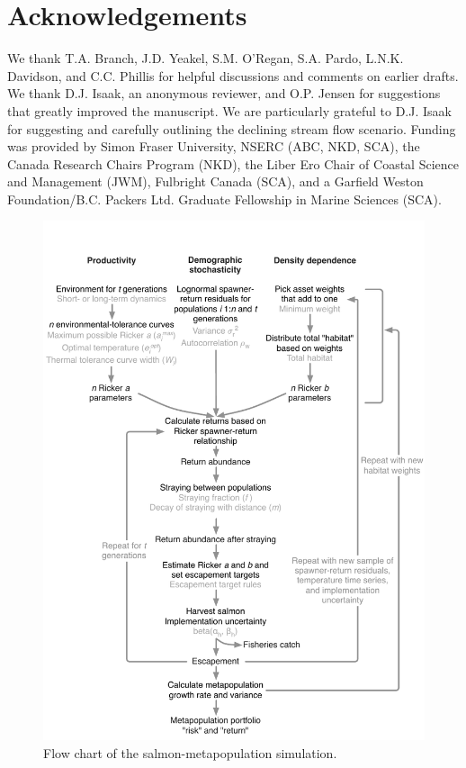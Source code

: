 \section{Acknowledgements}

We thank T.A. Branch, J.D. Yeakel, S.M. O'Regan, S.A. Pardo, L.N.K. Davidson, and C.C. Phillis for helpful discussions and comments on earlier drafts. We thank D.J. Isaak, an anonymous reviewer, and O.P. Jensen for suggestions that greatly improved the manuscript. We are particularly grateful to D.J. Isaak for suggesting and carefully outlining the declining stream flow scenario. Funding was provided by Simon Fraser University, NSERC (ABC, NKD, SCA), the Canada Research Chairs Program (NKD), the Liber Ero Chair of Coastal Science and Management (JWM), Fulbright Canada (SCA), and a Garfield Weston Foundation/B.C. Packers Ltd. Graduate Fellowship in Marine Sciences (SCA).

% 
% 

\begin{figure}[htbp]
\centering
\includegraphics[width=5in]{metafolio/Fig1.pdf}
\caption{
Flow chart of the salmon-metapopulation simulation.
} \label{f:flowchart}
\end{figure}


